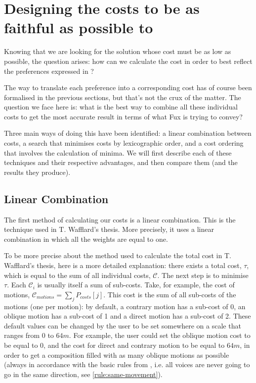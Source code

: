 \section{Designing the costs to be as faithful as possible to \gap} \label{costs}

Knowing that we are looking for the solution whose cost must be as low as possible, the question arises: how can we calculate the cost in order to best reflect the preferences expressed in \gap?

The way to translate each preference into a corresponding cost has of course been formalised in the previous sections, but that's not the crux of the matter. The question we face here is: what is the best way to combine all these individual costs to get the most accurate result in terms of what Fux is trying to convey?

Three main ways of doing this have been identified: a linear combination between costs, a search that minimises costs by lexicographic order, and a cost ordering that involves the calculation of minima. We will first describe each of these techniques and their respective advantages, and then compare them (and the results they produce).



\subsection{Linear Combination}


The first method of calculating our costs is a linear combination. This is the technique used in T. Wafflard's thesis. More precisely, it uses a linear combination in which all the weights are equal to one.



To be more precise about the method used to calculate the total cost in T. Wafflard's thesis, here is a more detailed explanation: there exists a total cost, $\tau$, which is equal to the sum of all individual costs, $\mathcal{C}$. The next step is to minimise $\tau$. Each $\mathcal{C}_i$ is usually itself a sum of sub-costs. Take, for example, the cost of motions, $\mathcal{C}_{motions} = \sum_j P_{costs}[j] $. This cost is the sum of all sub-costs of the motions (one per motion): by default, a contrary motion has a sub-cost of 0, an oblique motion has a sub-cost of 1 and a direct motion has a sub-cost of 2. These default values can be changed by the user to be set somewhere on a scale that ranges from $0$ to $64m$. For example, the user could set the oblique motion cost to be equal to $0$, and the cost for direct and contrary motion to be equal to $64m$, in order to get a composition filled with as many oblique motions as possible (always in accordance with the basic rules from \gap, i.e. all voices are never going to go in the same direction, see \ref{rule:same-movement}).


